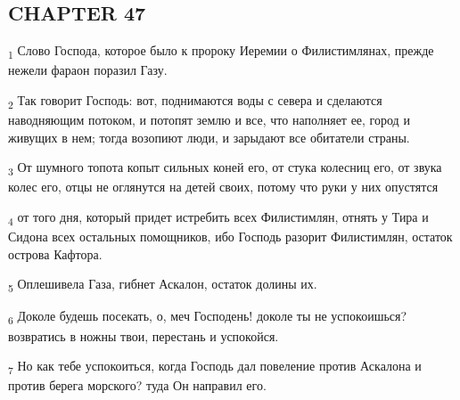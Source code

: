 \subsection{CHAPTER 47}
\begin{tcolorbox}
\textsubscript{1} Слово Господа, которое было к пророку Иеремии о Филистимлянах, прежде нежели фараон поразил Газу.
\end{tcolorbox}
\begin{tcolorbox}
\textsubscript{2} Так говорит Господь: вот, поднимаются воды с севера и сделаются наводняющим потоком, и потопят землю и все, что наполняет ее, город и живущих в нем; тогда возопиют люди, и зарыдают все обитатели страны.
\end{tcolorbox}
\begin{tcolorbox}
\textsubscript{3} От шумного топота копыт сильных коней его, от стука колесниц его, от звука колес его, отцы не оглянутся на детей своих, потому что руки у них опустятся
\end{tcolorbox}
\begin{tcolorbox}
\textsubscript{4} от того дня, который придет истребить всех Филистимлян, отнять у Тира и Сидона всех остальных помощников, ибо Господь разорит Филистимлян, остаток острова Кафтора.
\end{tcolorbox}
\begin{tcolorbox}
\textsubscript{5} Оплешивела Газа, гибнет Аскалон, остаток долины их.
\end{tcolorbox}
\begin{tcolorbox}
\textsubscript{6} Доколе будешь посекать, о, меч Господень! доколе ты не успокоишься? возвратись в ножны твои, перестань и успокойся.
\end{tcolorbox}
\begin{tcolorbox}
\textsubscript{7} Но как тебе успокоиться, когда Господь дал повеление против Аскалона и против берега морского? туда Он направил его.
\end{tcolorbox}
